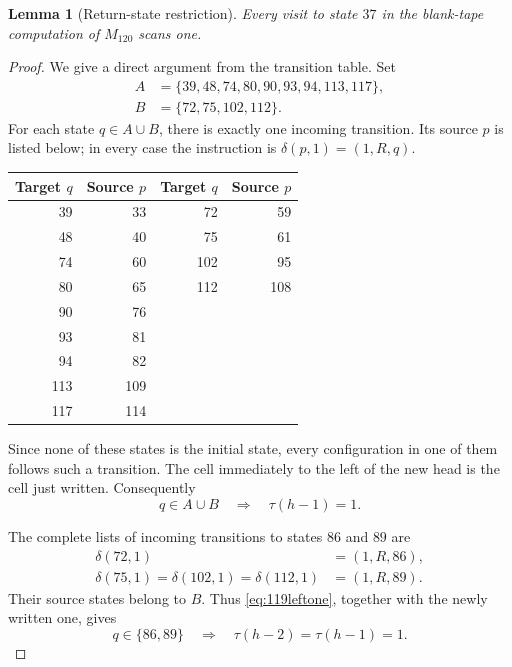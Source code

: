 \documentclass[11pt]{article}
\newtheorem{lemma}[theorem]{Lemma}
\begin{document}
\begin{lemma}[Return-state restriction]
\label{lem:119return}
Every visit to state $37$ in the blank-tape computation of $M_{120}$
scans one.
\end{lemma}

\begin{proof}
We give a direct argument from the transition table. Set
\[
\begin{split}
 A&=\{39,48,74,80,90,93,94,113,117\},\\
 B&=\{72,75,102,112\}.
\end{split}
\]
For each state $q\in A\cup B$, there is exactly one incoming transition.
Its source $p$ is listed below; in every case the instruction is
$\delta(p,1)=(1,R,q)$.
\begin{center}
\begin{tabular}{rr@{\qquad}rr}
\toprule
Target $q$ & Source $p$ & Target $q$ & Source $p$\\
\midrule
39 & 33 & 72 & 59\\
48 & 40 & 75 & 61\\
74 & 60 & 102 & 95\\
80 & 65 & 112 & 108\\
90 & 76 & & \\
93 & 81 & & \\
94 & 82 & & \\
113 & 109 & & \\
117 & 114 & & \\
\bottomrule
\end{tabular}
\end{center}
Since none of these states is the initial state, every configuration in
one of them follows such a transition. The cell immediately to the left
of the new head is the cell just written. Consequently
\begin{equation}
\label{eq:119leftone}
 q\in A\cup B\quad\Longrightarrow\quad\tau(h-1)=1.
\end{equation}

The complete lists of incoming transitions to states $86$ and $89$ are
\[
\begin{aligned}
 \delta(72,1)&=(1,R,86),\\
 \delta(75,1)=\delta(102,1)=\delta(112,1)&=(1,R,89).
\end{aligned}
\]
Their source states belong to $B$. Thus \eqref{eq:119leftone}, together
with the newly written one, gives
\begin{equation}
\label{eq:119twoleft}
 q\in\{86,89\}\quad\Longrightarrow\quad
 \tau(h-2)=\tau(h-1)=1.
\end{equation}


\end{proof}
\end{document}
